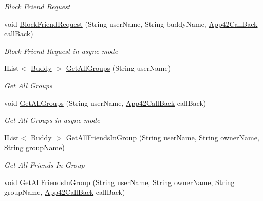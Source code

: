\begin{DoxyCompactItemize}
\begin{DoxyCompactList}\small\item\em Block Friend Request \end{DoxyCompactList}\item 
void \hyperlink{classcom_1_1shephertz_1_1app42_1_1paas_1_1sdk_1_1csharp_1_1buddy_1_1_buddy_service_a67f1c42f2b0506ed93d79a137d8b0ab0}{Block\+Friend\+Request} (String user\+Name, String buddy\+Name, \hyperlink{interfacecom_1_1shephertz_1_1app42_1_1paas_1_1sdk_1_1csharp_1_1_app42_call_back}{App42\+Call\+Back} call\+Back)
\begin{DoxyCompactList}\small\item\em Block Friend Request in async mode \end{DoxyCompactList}\item 
I\+List$<$ \hyperlink{classcom_1_1shephertz_1_1app42_1_1paas_1_1sdk_1_1csharp_1_1buddy_1_1_buddy}{Buddy} $>$ \hyperlink{classcom_1_1shephertz_1_1app42_1_1paas_1_1sdk_1_1csharp_1_1buddy_1_1_buddy_service_a86a903ebc994b047f99dcc5f03946f28}{Get\+All\+Groups} (String user\+Name)
\begin{DoxyCompactList}\small\item\em Get All Groups \end{DoxyCompactList}\item 
void \hyperlink{classcom_1_1shephertz_1_1app42_1_1paas_1_1sdk_1_1csharp_1_1buddy_1_1_buddy_service_af4660d5c1554d866714094ab32560c5a}{Get\+All\+Groups} (String user\+Name, \hyperlink{interfacecom_1_1shephertz_1_1app42_1_1paas_1_1sdk_1_1csharp_1_1_app42_call_back}{App42\+Call\+Back} call\+Back)
\begin{DoxyCompactList}\small\item\em Get All Groups in async mode \end{DoxyCompactList}\item 
I\+List$<$ \hyperlink{classcom_1_1shephertz_1_1app42_1_1paas_1_1sdk_1_1csharp_1_1buddy_1_1_buddy}{Buddy} $>$ \hyperlink{classcom_1_1shephertz_1_1app42_1_1paas_1_1sdk_1_1csharp_1_1buddy_1_1_buddy_service_a508cc16b9e40e80b9b74a93e68110494}{Get\+All\+Friends\+In\+Group} (String user\+Name, String owner\+Name, String group\+Name)
\begin{DoxyCompactList}\small\item\em Get All Friends In Group \end{DoxyCompactList}\item 
void \hyperlink{classcom_1_1shephertz_1_1app42_1_1paas_1_1sdk_1_1csharp_1_1buddy_1_1_buddy_service_ad39f3803aa7ffeb3a2885201822e13a8}{Get\+All\+Friends\+In\+Group} (String user\+Name, String owner\+Name, String group\+Name, \hyperlink{interfacecom_1_1shephertz_1_1app42_1_1paas_1_1sdk_1_1csharp_1_1_app42_call_back}{App42\+Call\+Back} call\+Back)

\end{DoxyCompactItemize}
